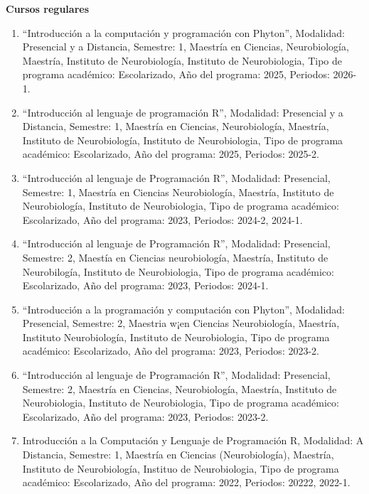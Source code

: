 \textbf{Cursos regulares}

\begin{enumerate}

\item “Introducción a la computación y programación con Phyton”, Modalidad: Presencial y a Distancia, Semestre: 1, Maestría 
en 
Ciencias, Neurobiología, Maestría, Instituto de Neurobiología, Instituto de Neurobiologia, Tipo de programa académico: 
Escolarizado, Año del programa: 2025, Periodos: 2026-1.

\item “Introducción al lenguaje de programación R”, Modalidad: Presencial y a Distancia, Semestre: 1, Maestría en Ciencias, 
Neurobiología, Maestría, Instituto de Neurobiología, Instituto de Neurobiologia, Tipo de programa académico: Escolarizado, 
Año del programa: 2025, Periodos: 2025-2.

\item “Introducción al lenguaje de Programación R”, Modalidad: Presencial, Semestre: 1, Maestría en Ciencias Neurobiología, 
Maestría, Instituto de Neurobiología, Instituto de Neurobiologia, Tipo de programa académico: Escolarizado, Año del programa: 
2023, Periodos: 2024-2, 2024-1.

\item “Introducción al lenguaje de Programación R”, Modalidad: Presencial, Semestre: 2, Maestía en Ciencias neurobiología, 
Maestría, Instituto de Neurobilogía, Instituto de Neurobiologia, Tipo de programa académico: Escolarizado, Año del programa: 
2023, Periodos: 2024-1.

\item “Introducción a la programación y computación con Phyton”, Modalidad: Presencial, Semestre: 2, Maestria w¡en Ciencias 
Neurobiología, Maestría, Instituto Neurobiología, Instituto de Neurobiologia, Tipo de programa académico: Escolarizado, Año 
del programa: 2023, Periodos: 2023-2.

\item “Introducción al lenguaje de Programación R”, Modalidad: Presencial, Semestre: 2, Maestría en Ciencias, Neurobiología, 
Maestría, Instituto de Neurobiologia, Instituto de Neurobiologia, Tipo de programa académico: Escolarizado, Año del programa: 
2023, Periodos: 2023-2.

\item Introducción a la Computación y Lenguaje de Programación R, Modalidad: A Distancia, Semestre: 1, Maestría en Ciencias 
(Neurobiología), Maestría, Instituto de Neurobiología, Instituo de Neurobiologia, Tipo de programa académico: Escolarizado, 
Año del programa: 2022, Periodos: 20222, 2022-1.


\end{enumerate}
